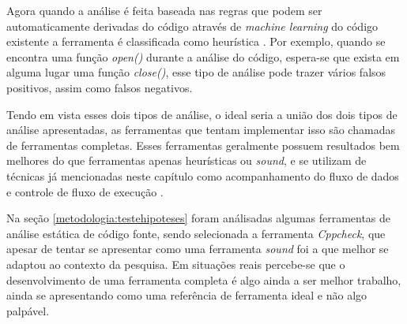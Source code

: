 Agora quando a análise é feita baseada nas regras que podem ser automaticamente
derivadas do código através de \textit{machine learning} do código existente a
ferramenta é classificada como heurística \cite{paul:2001}. Por exemplo, quando
se encontra uma função \textit{open()} durante a análise do código, espera-se
que exista em alguma lugar uma função \textit{close()}, esse tipo de análise
pode trazer vários falsos positivos, assim como falsos negativos.

Tendo em vista esses dois tipos de análise, o ideal seria a união dos dois tipos
de análise apresentadas, as ferramentas que tentam implementar isso são chamadas
de ferramentas completas. Esses ferramentas geralmente possuem resultados bem
melhores do que ferramentas apenas heurísticas ou \textit{sound}, e se utilizam
de técnicas já mencionadas neste capítulo como acompanhamento do fluxo de dados
e controle de fluxo de execução \cite{paul:2001}.

Na seção \ref{metodologia:testehipoteses} foram análisadas algumas ferramentas
de análise estática de código fonte, sendo selecionada a ferramenta
\textit{Cppcheck}, que apesar de tentar se apresentar como uma ferramenta
\textit{sound} foi a que melhor se adaptou ao contexto da pesquisa. Em situações
reais percebe-se que o desenvolvimento de uma ferramenta completa é algo ainda a
ser melhor trabalho, ainda se apresentando como uma referência de ferramenta
ideal e não algo palpável.
